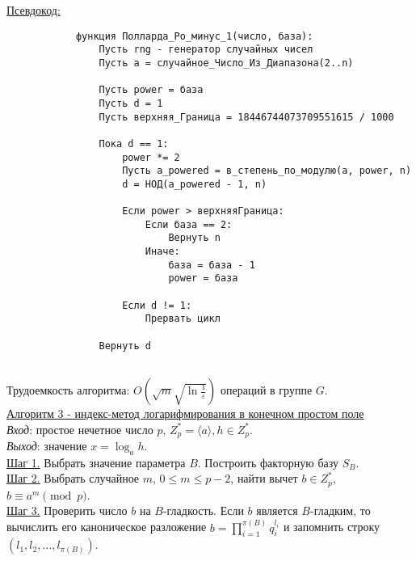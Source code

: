 \documentclass[bachelor, och, labwork]{shiza}
\begin{document}
        \underline{Псевдокод:}
            \begin{verbatim}
            функция Полларда_Ро_минус_1(число, база):
                Пусть rng - генератор случайных чисел
                Пусть a = случайное_Число_Из_Диапазона(2..n)
                
                Пусть power = база
                Пусть d = 1
                Пусть верхняя_Граница = 18446744073709551615 / 1000
            
                Пока d == 1:
                    power *= 2
                    Пусть a_powered = в_степень_по_модулю(a, power, n)
                    d = НОД(a_powered - 1, n)
                    
                    Если power > верхняяГраница:
                        Если база == 2:
                            Вернуть n
                        Иначе:
                            база = база - 1
                            power = база
            
                    Если d != 1:
                        Прервать цикл
                
                Вернуть d
                         
            \end{verbatim}

            Трудоемкость алгоритма: $O(\sqrt{m}\sqrt{\ln
            \frac{1}{\varepsilon}})$ операций в группе $G$.\\


        \underline{Алгоритм 3 - индекс-метод логарифмирования в конечном простом поле}\\
            \textit{Вход}: простое нечетное число $p$, $Z^*_p = \langle a \rangle, h \in Z^*_p$.\\
            \textit{Выход}: значение $x = \log_a h$.\\
            \underline{Шаг 1.} Выбрать значение параметра $B$. Построить
            факторную базу $S_B$.\\
            \underline{Шаг 2.} Выбрать случайное $m$, $0 \leq m \leq p - 2$,
            найти вычет $b \in Z^*_p$, $b \equiv a^m \pmod p$.\\
            \underline{Шаг 3.} Проверить число $b$ на $B$-гладкость. Если $b$
            является $B$-гладким, то вычислить его каноническое разложение $b =
            \prod_{i = 1}^{\pi(B)} q_i^{l_i}$ и запомнить строку $(l_1, l_2,
            \dots, l_{\pi(B)})$.
            
\end{document}
